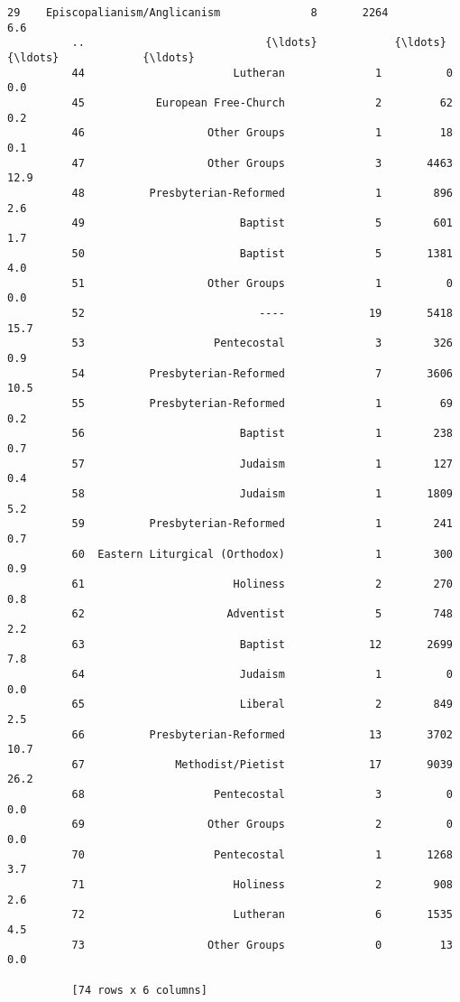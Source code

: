 \documentclass[11pt]{article}
\begin{document}
\begin{Verbatim}[commandchars=\\\{\}]
          29    Episcopalianism/Anglicanism              8       2264             6.6  
          ..                            {\ldots}            {\ldots}        {\ldots}             {\ldots}  
          44                       Lutheran              1          0             0.0  
          45           European Free-Church              2         62             0.2  
          46                   Other Groups              1         18             0.1  
          47                   Other Groups              3       4463            12.9  
          48          Presbyterian-Reformed              1        896             2.6  
          49                        Baptist              5        601             1.7  
          50                        Baptist              5       1381             4.0  
          51                   Other Groups              1          0             0.0  
          52                           ----             19       5418            15.7  
          53                    Pentecostal              3        326             0.9  
          54          Presbyterian-Reformed              7       3606            10.5  
          55          Presbyterian-Reformed              1         69             0.2  
          56                        Baptist              1        238             0.7  
          57                        Judaism              1        127             0.4  
          58                        Judaism              1       1809             5.2  
          59          Presbyterian-Reformed              1        241             0.7  
          60  Eastern Liturgical (Orthodox)              1        300             0.9  
          61                       Holiness              2        270             0.8  
          62                      Adventist              5        748             2.2  
          63                        Baptist             12       2699             7.8  
          64                        Judaism              1          0             0.0  
          65                        Liberal              2        849             2.5  
          66          Presbyterian-Reformed             13       3702            10.7  
          67              Methodist/Pietist             17       9039            26.2  
          68                    Pentecostal              3          0             0.0  
          69                   Other Groups              2          0             0.0  
          70                    Pentecostal              1       1268             3.7  
          71                       Holiness              2        908             2.6  
          72                       Lutheran              6       1535             4.5  
          73                   Other Groups              0         13             0.0  
          
          [74 rows x 6 columns]
\end{Verbatim}
            
\end{document}
